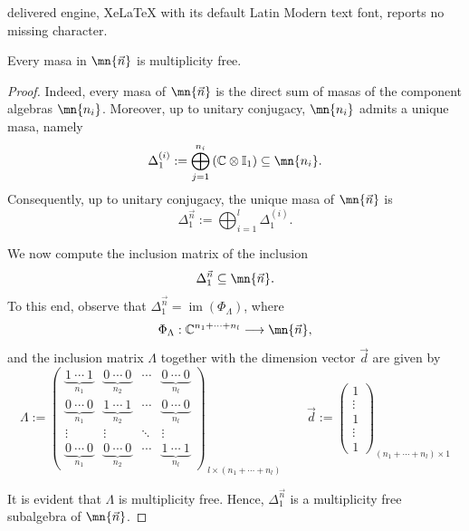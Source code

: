 \documentclass[10pt,a4paper]{amsart}
\newcommand{\C}{\mathbb{C}}
\begin{document}
delivered engine, XeLaTeX with its default Latin Modern text font, reports no missing character.
\begin{prop}\label{prop:masa_is_mult_free}
    Every masa in $\mn{\vec{n}}$ is multiplicity free.
\end{prop}

\begin{proof}
    Indeed, every masa of $\mn{\vec{n}}$ is the direct sum of masas of the component algebras $\mn{n_i}$. Moreover, up to unitary conjugacy, $\mn{n_i}$ admits a unique masa, namely
\[
\Delta_1^{(i)}:= \bigoplus_{j=1}^{n_i} \left( \C \otimes \mathbb{I}_1 \right) \subseteq \mn{n_i}.
\]
Consequently, up to unitary conjugacy, the unique masa of $\mn{\vec{n}}$ is
\[
\Delta_1^{\vec{n}}:=\bigoplus_{i=1}^l \Delta_1^{(i)}.
\]

We now compute the inclusion matrix of the inclusion
\[
\Delta_1^{\vec{n}} \subseteq \mn{\vec{n}}.
\]
To this end, observe that $\Delta_1^{\vec{n}}=\operatorname{im}(\Phi_\Lambda)$, where
\[
\Phi_\Lambda:\C^{n_1+\cdots+n_l}\longrightarrow \mn{\vec{n}},
\]
and the inclusion matrix $\Lambda$ together with the dimension vector $\vec{d}$ are given by
\[
\Lambda:=
\begin{pmatrix}
\underbrace{1\ \cdots\ 1}_{n_1} &
\underbrace{0\ \cdots\ 0}_{n_2} &
\cdots &
\underbrace{0\ \cdots\ 0}_{n_l}
\\
\underbrace{0\ \cdots\ 0}_{n_1} &
\underbrace{1\ \cdots\ 1}_{n_2} &
\cdots &
\underbrace{0\ \cdots\ 0}_{n_l}
\\
\vdots & \vdots & \ddots & \vdots
\\
\underbrace{0\ \cdots\ 0}_{n_1} &
\underbrace{0\ \cdots\ 0}_{n_2} &
\cdots &
\underbrace{1\ \cdots\ 1}_{n_l}
\end{pmatrix}_{\,l\times (n_1+\cdots+n_l)}
\qquad
\vec{d}:=
\begin{pmatrix}
1\\
\vdots\\
1\\
\vdots\\
1
\end{pmatrix}_{(n_1+\cdots+n_l)\times 1}
\]

It is evident that $\Lambda$ is multiplicity free. Hence, $\Delta_1^{\vec{n}}$ is a multiplicity free subalgebra of $\mn{\vec{n}}$.
\end{proof}
\end{document}
